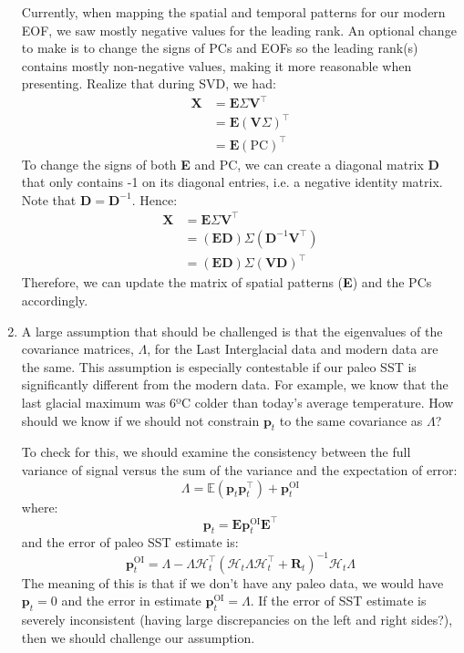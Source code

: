 \documentclass{article}
\begin{document}
\begin{enumerate}
    Currently, when mapping the spatial and temporal patterns for our modern EOF, we saw mostly negative values for the leading rank. 
    An optional change to make is to change the signs of PCs and EOFs so the leading rank(s) contains mostly non-negative values, making it more reasonable when presenting. Realize that during SVD, we had:
        \begin{align*}
            \textbf{X} &= \textbf{E} \Sigma \textbf{V}^\intercal \\
            &= \textbf{E}{(\textbf{V}\Sigma)}^\intercal \\
            &= \textbf{E} (\text{PC})^\intercal
        \end{align*}
    To change the signs of both \textbf{E} and PC, we can create a diagonal matrix \textbf{D} that only contains -1 on its diagonal entries, i.e. a negative identity matrix. Note that $\textbf{D} = \textbf{D}^{-1}$. Hence:
        \begin{align*}
            \textbf{X} &= \textbf{E} \Sigma \textbf{V}^\intercal \\
            &= (\textbf{ED}) \Sigma (\textbf{D}^{-1} \textbf{V}^\intercal)\\
            &= (\textbf{ED}) \Sigma (\textbf{VD})^\intercal
        \end{align*}
    Therefore, we can update the matrix of spatial patterns (\textbf{E}) and the PCs accordingly.

    \item A large assumption that should be challenged is that the eigenvalues of the covariance matrices, $\Lambda$, for the Last Interglacial data and modern data are the same. 
    This assumption is especially contestable if our paleo SST is significantly different from the modern data. For example, we know that the last glacial maximum was 6ºC colder than today's average temperature. How should we know if we should not constrain $\textbf{p}_t$ to the same covariance as $\Lambda$?

    To check for this, we should examine the consistency between the full variance of signal versus the sum of the variance and the expectation of error:
    $$\Lambda = \mathbb{E}(\textbf{p}_t\textbf{p}_t^\intercal)+\textbf{p}^{\text{OI}}_t$$
    where:
    $$\textbf{p}_t = \textbf{E} \textbf{p}_t^{\text{OI}} \textbf{E}^\intercal$$
    and the error of paleo SST estimate is:
    $$\textbf{p}_t^{\text{OI}} = \Lambda - \Lambda \mathcal{H}^\intercal_t (\mathcal{H}_t \Lambda \mathcal{H}_t^\intercal + \textbf{R}_t)^{-1} \mathcal{H}_t\Lambda$$
    The meaning of this is that if we don't have any paleo data, we would have $\textbf{p}_t = 0$ and the error in estimate $\textbf{p}_t^{\text{OI}} = \Lambda$. If the error of SST estimate is severely inconsistent (having large discrepancies on the left and right sides?), then we should challenge our assumption.


\end{enumerate}
\end{document}
